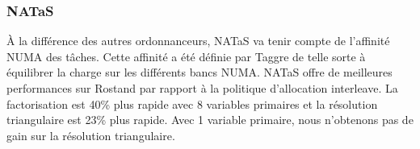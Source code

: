 \subsubsection{NATaS}
\`A la différence des autres ordonnanceurs, NATaS va tenir compte de l'affinité NUMA des tâches.
%
Cette affinité a été définie par Taggre de telle sorte à équilibrer la charge sur les différents bancs NUMA.
%
NATaS offre de meilleures performances sur Rostand par rapport à la politique d'allocation interleave.
%
La factorisation est 40\% plus rapide avec 8 variables primaires et la résolution triangulaire est 23\% plus rapide.
%
Avec 1 variable primaire, nous n'obtenons pas de gain sur la résolution triangulaire.
